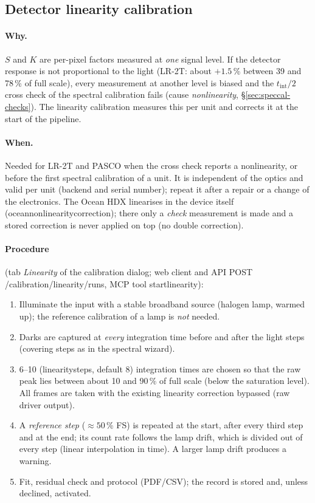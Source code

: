 \documentclass[12pt,a4paper]{article}
\DeclareRobustCommand{\code}[1]{{\ttfamily\small\def\_{\rawus\allowbreak}#1}}
\DeclareRobustCommand{\key}[1]{{\ttfamily\small\color{acc2}\def\_{\rawus\allowbreak}#1}}
\begin{document}
\subsection{Detector linearity calibration}\label{sec:linearity}
\paragraph{Why.} $S$ and $K$ are per-pixel factors measured at \emph{one} signal
level. If the detector response is not proportional to the light (LR-2T: about
$+1.5$\,\% between 39 and 78\,\% of full scale), every measurement at another
level is biased and the $t_{\mathrm{int}}/2$ cross check of the spectral
calibration fails (cause \emph{nonlinearity}, \S\ref{sec:speccal-checks}). The
linearity calibration measures this per unit and corrects it at the start of the
pipeline.

\paragraph{When.} Needed for LR-2T and PASCO when the cross check reports a
nonlinearity, or before the first spectral calibration of a unit. It is
independent of the optics and valid per unit (backend and serial number);
repeat it after a repair or a change of the electronics. The Ocean HDX
linearises in the device itself (\key{ocean\_nonlinearity\_correction}); there
only a \emph{check} measurement is made and a stored correction is never applied
on top (no double correction).

\paragraph{Procedure} (tab \emph{Linearity} of the calibration dialog; web
client and API \code{POST /calibration/linearity/runs}, MCP tool
\code{start\_linearity}):
\begin{enumerate}
  \item Illuminate the input with a stable broadband source (halogen lamp, warmed
        up); the reference calibration of a lamp is \emph{not} needed.
  \item Darks are captured at \emph{every} integration time before and after the
        light steps (covering steps as in the spectral wizard).
  \item 6--10 (\key{linearity\_steps}, default 8) integration times are chosen so
        that the raw peak lies between about 10 and 90\,\% of full scale
        (below the saturation level). All frames are taken with the existing
        linearity correction bypassed (raw driver output).
  \item A \emph{reference step} ($\approx50$\,\% FS) is repeated at the start,
        after every third step and at the end; its count rate follows the lamp
        drift, which is divided out of every step (linear interpolation in
        time). A larger lamp drift produces a warning.
  \item Fit, residual check and protocol (PDF/CSV); the record is stored and,
        unless declined, activated.
\end{enumerate}
\end{document}
